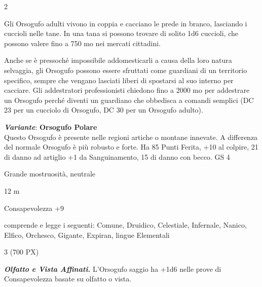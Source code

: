 \begin{multicols}{2}
{Gli Orsogufo adulti vivono in coppia e cacciano le prede in branco, lasciando i cuccioli nelle tane. In una tana si possono trovare di solito 1d6 cuccioli, che possono valere fino a 750 mo nei mercati cittadini.

Anche se è pressoché impossibile addomesticarli a causa della loro natura selvaggia, gli Orsogufo possono essere sfruttati come guardiani di un territorio specifico, sempre che vengano lasciati liberi di spostarsi al suo interno per cacciare. Gli addestratori professionisti chiedono fino a 2000 mo per addestrare un Orsogufo perché diventi un guardiano che obbedisca a comandi semplici (DC 23 per un cucciolo di Orsogufo, DC 30 per un Orsogufo adulto).

\emph{\textbf{Variante}}: \textbf{Orsogufo Polare}\\
Questo Orsogufo è presente nelle regioni artiche o montane innevate. A differenza del normale Orsogufo è più robusto e forte. Ha 85 Punti Ferita, +10 al colpire, 21 di danno ad artiglio +1 da Sanguinamento, 15 di danno con becco. GS 4

\begin{description}[noitemsep, topsep=0pt, parsep=0pt, partopsep=0pt, itemsep=1pt, leftmargin=2.35cm,  labelwidth=2.2cm, itemindent=0cm, listparindent=0pt] %
\setlength{\baselineskip}{10pt}
\item[\textbf{Taglia/Tipo}] Grande mostruosità, neutrale
\item[\textbf{Caratt.}] 
\item[\textbf{Punti Ferita}] 
\item[\textbf{Movimento}] 12 m
\item[\textbf{Tiri Salvez.}] 
\item[\textbf{Comp.}] Consapevolezza +9
\item[\textbf{Sensi}] 
\item[\textbf{Linguaggi}] comprende e legge i seguenti: Comune, Druidico, Celestiale, Infernale, Nanico, Elfico, Orchesco, Gigante, Expiran, lingue Elementali
\item[\textbf{Sfida}] 3 (700 PX)
\end{description}
\smallskip

\emph{\textbf{Olfatto e Vista Affinati.}} L'Orsogufo saggio ha +1d6 nelle prove di Consapevolezza basate su olfatto o vista.

}
\end{multicols}

